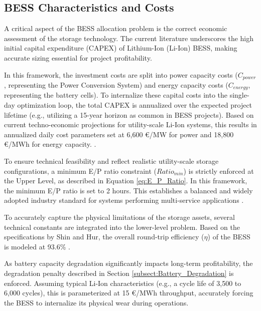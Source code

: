 \subsection{BESS Characteristics and Costs} \label{subsect:BESS_Characteristics}
A critical aspect of the BESS allocation problem is the correct economic assessment of the storage technology. The current literature underscores the high initial capital expenditure (CAPEX) of Lithium-Ion (Li-Ion) BESS, making accurate sizing essential for project profitability.

In this framework, the investment costs are split into power capacity costs (\(C_{power}\), representing the Power Conversion System) and energy capacity costs (\(C_{energy}\), representing the battery cells). To internalize these capital costs into the single-day optimization loop, the total CAPEX is annualized over the expected project lifetime (e.g., utilizing a 15-year horizon as common in BESS projects). Based on current techno-economic projections for utility-scale Li-Ion systems, this results in annualized daily cost parameters set at 6,600 €/MW for power and 18,800 €/MWh for energy capacity. \cite{shin_optimal_2020}.

To ensure technical feasibility and reflect realistic utility-scale storage configurations, a minimum E/P ratio constraint (\(Ratio_{min}\)) is strictly enforced at the Upper Level, as described in Equation \ref{eq:E_P_Ratio}. In this framework, the minimum E/P ratio is set to 2 hours. This establishes a balanced and widely adopted industry standard for systems performing multi-service applications \cite{das_optimal_2020, shin_optimal_2020}.

To accurately capture the physical limitations of the storage assets, several technical constants are integrated into the lower-level problem. Based on the specifications by Shin and Hur, the overall round-trip efficiency (\(\eta\)) of the BESS is modeled at 93.6\% \cite{shin_optimal_2020}.

As battery capacity degradation significantly impacts long-term profitability, the degradation penalty described in Section \ref{subsect:Battery_Degradation} is enforced. Assuming typical Li-Ion characteristics (e.g., a cycle life of 3,500 to 6,000 cycles), this is parameterized at 15 €/MWh throughput, accurately forcing the BESS to internalize its physical wear during operations.